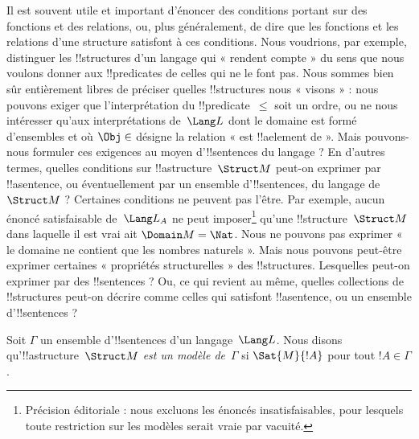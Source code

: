 \documentclass[../../../include/open-logic-section]{subfiles}
\begin{document}


\begin{explain}
Il est souvent utile et important d'énoncer des conditions portant
sur des fonctions et des relations, ou, plus généralement, de dire
que les fonctions et les relations d'une structure satisfont à ces
conditions. Nous voudrions, par exemple, distinguer les
!!{structure}s d'un langage qui « rendent compte » du sens que nous
voulons donner aux !!{predicate}s de celles qui ne le font pas.
Nous sommes bien sûr entièrement libres de préciser quelles
!!{structure}s nous « visons » : nous pouvons exiger que
l'interprétation du !!{predicate}~$\le$ soit un ordre, ou ne nous
intéresser qu'aux interprétations de~$\Lang L$ dont le domaine est
formé d'ensembles et où $\Obj \in$ désigne la relation
« est !!a{element} de ». Mais pouvons-nous formuler ces exigences
au moyen d'!!{sentence}s du langage ? En d'autres termes, quelles
conditions sur !!a{structure}~$\Struct M$ peut-on exprimer par
!!a{sentence}, ou éventuellement par un ensemble d'!!{sentence}s,
du langage de~$\Struct M$ ? Certaines conditions ne peuvent pas
l'être. Par exemple, aucun énoncé satisfaisable de~$\Lang L_A$ ne peut imposer\footnote{Précision éditoriale : nous excluons les énoncés insatisfaisables, pour lesquels toute restriction sur les modèles serait vraie par vacuité.}
qu'une !!{structure}~$\Struct M$ dans laquelle il est vrai ait
$\Domain M = \Nat$. Nous ne pouvons pas exprimer
« le domaine ne contient que les nombres naturels ». Mais nous
pouvons peut-être exprimer certaines « propriétés structurelles »
des !!{structure}s. Lesquelles peut-on exprimer par des
!!{sentence}s ? Ou, ce qui revient au même, quelles collections de
!!{structure}s peut-on décrire comme celles qui satisfont
!!a{sentence}, ou un ensemble d'!!{sentence}s ?
\end{explain}

\begin{defn}
Soit $\Gamma$ un ensemble d'!!{sentence}s d'un langage~$\Lang L$.
Nous disons qu'!!a{structure}~$\Struct M$ \emph{est un modèle
de}~$\Gamma$ si $\Sat{M}{!A}$ pour tout $!A \in \Gamma$.
\end{defn}
\end{document}
